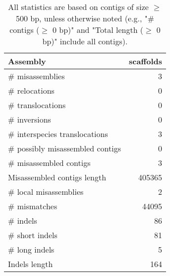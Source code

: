 \documentclass[12pt,a4paper]{article}
\begin{document}
\begin{table}[ht]
\begin{center}
\caption{All statistics are based on contigs of size $\geq$ 500 bp, unless otherwise noted (e.g., "\# contigs ($\geq$ 0 bp)" and "Total length ($\geq$ 0 bp)" include all contigs).}
\begin{tabular}{|l*{1}{|r}|}
\hline
Assembly & scaffolds \\ \hline
\# misassemblies & 3 \\ \hline
\hspace{5mm}\# relocations & 0 \\ \hline
\hspace{5mm}\# translocations & 0 \\ \hline
\hspace{5mm}\# inversions & 0 \\ \hline
\hspace{5mm}\# interspecies translocations & 3 \\ \hline
\# possibly misassembled contigs & 0 \\ \hline
\# misassembled contigs & 3 \\ \hline
Misassembled contigs length & 405365 \\ \hline
\# local misassemblies & 2 \\ \hline
\# mismatches & 44095 \\ \hline
\# indels & 86 \\ \hline
\hspace{5mm}\# short indels & 81 \\ \hline
\hspace{5mm}\# long indels & 5 \\ \hline
Indels length & 164 \\ \hline
\end{tabular}
\end{center}
\end{table}
\end{document}
